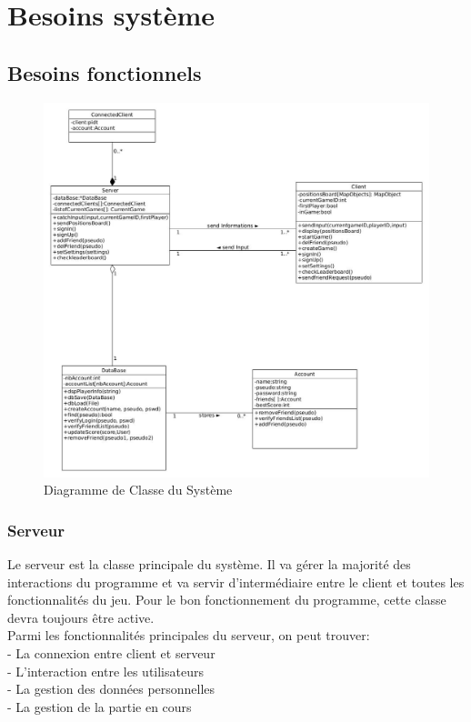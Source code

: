 \documentclass[a4paper,12pt]{article}
\begin{document}
\section{Besoins système}
\subsection{Besoins fonctionnels}

\begin{figure}[h!]
\centering
\includegraphics[width=16cm]{images/newSystemClassDiagram.jpg}
\caption{Diagramme de Classe du Système}
\label{fig:UerUseCase}
\end{figure}

\subsubsection{Serveur}
Le serveur est la classe principale du système. Il va gérer la majorité des interactions du programme et va servir d'intermédiaire entre le client et toutes les fonctionnalités du jeu. Pour le bon fonctionnement du programme, cette classe devra toujours être active.\\
Parmi les fonctionnalités principales du serveur, on peut trouver:\\
- La connexion entre client et serveur\\
- L'interaction entre les utilisateurs\\
- La gestion des données personnelles\\
- La gestion de la partie en cours 
\end{document}
